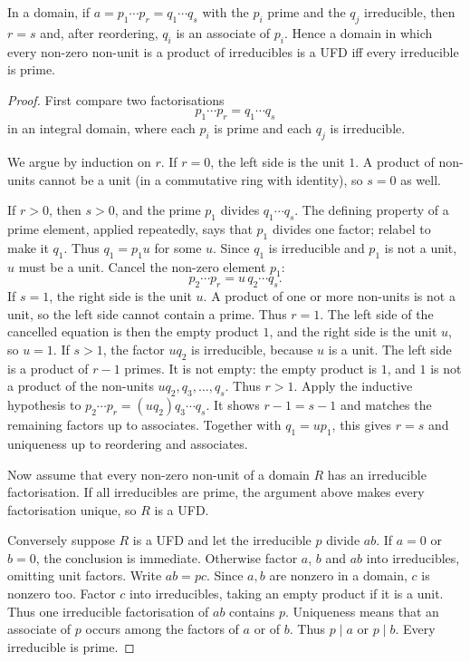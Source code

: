 \begin{lemma}\label{lem:primeufd}
In a domain, if $a=p_1\cdots p_r=q_1\cdots q_s$ with the $p_i$ prime and the $q_j$ irreducible, then $r=s$ and, after reordering, $q_i$ is an associate of $p_i$. Hence a domain in which every non-zero non-unit is a product of irreducibles is a UFD iff every irreducible is prime.
\end{lemma}
\begin{proof}
First compare two factorisations
\[
p_1\cdots p_r=q_1\cdots q_s
\]
in an integral domain, where each $p_i$
is prime and each $q_j$ is irreducible.

We argue by induction on $r$.
If $r=0$, the left side is the unit $1$.
A product of non-units cannot be a unit
(in a commutative ring with identity),
so $s=0$ as well.

If $r>0$, then $s>0$, and the prime
$p_1$ divides $q_1\cdots q_s$.
The defining property of a prime element,
applied repeatedly, says that $p_1$
divides one factor; relabel to make it
$q_1$. Thus $q_1=p_1u$ for some $u$.
Since $q_1$ is irreducible and $p_1$
is not a unit, $u$ must be a unit.
Cancel the non-zero element $p_1$:
\[
p_2\cdots p_r=u\,q_2\cdots q_s.
\]
If $s=1$, the right side is the unit $u$.
A product of one or more non-units is not a unit, so the left side cannot contain a prime. Thus $r=1$. The left side of the cancelled equation is then the empty product $1$, and the right side is the unit $u$, so $u=1$.
If $s>1$, the factor $uq_2$ is irreducible, because $u$ is a unit.
The left side is a product of $r-1$ primes. It is not empty: the empty product is $1$, and $1$ is not a product of the non-units $uq_2,q_3,\ldots,q_s$. Thus $r>1$.
Apply the inductive hypothesis to
$p_2\cdots p_r=(uq_2)q_3\cdots q_s$.
It shows $r-1=s-1$ and matches the
remaining factors up to associates.
Together with $q_1=up_1$, this gives
$r=s$ and uniqueness up to reordering
and associates.

Now assume that every non-zero non-unit
of a domain $R$ has an irreducible
factorisation. If all irreducibles are
prime, the argument above makes every
factorisation unique, so $R$ is a UFD.

Conversely suppose $R$ is a UFD and
let the irreducible $p$ divide $ab$.
If $a=0$ or $b=0$, the conclusion
is immediate. Otherwise factor $a$,
$b$ and $ab$ into irreducibles, omitting
unit factors. Write $ab=pc$. Since $a,b$ are nonzero in a domain, $c$ is nonzero too.
Factor $c$ into irreducibles, taking an empty product if it is a unit.
Thus one irreducible factorisation of $ab$ contains $p$.
Uniqueness means that an associate of
$p$ occurs among the factors of $a$
or of $b$. Thus $p\mid a$ or $p\mid b$.
Every irreducible is prime.
\end{proof}


